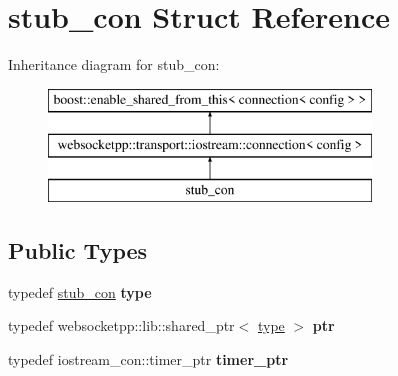 \hypertarget{structstub__con}{}\section{stub\+\_\+con Struct Reference}
\label{structstub__con}
Inheritance diagram for stub\+\_\+con\+:\begin{figure}[H]
\begin{center}
\leavevmode
\includegraphics[height=3.000000cm]{structstub__con}
\end{center}
\end{figure}
\subsection*{Public Types}
\begin{DoxyCompactItemize}
\item 
typedef \hyperlink{structstub__con}{stub\+\_\+con} {\bfseries type}\hypertarget{structstub__con_a5ca630044e6795a895c38ea34a757c22}{}\label{structstub__con_a5ca630044e6795a895c38ea34a757c22}

\item 
typedef websocketpp\+::lib\+::shared\+\_\+ptr$<$ \hyperlink{structstub__con}{type} $>$ {\bfseries ptr}\hypertarget{structstub__con_a98ad8f9925a9530ac1a8e4406e4a2287}{}\label{structstub__con_a98ad8f9925a9530ac1a8e4406e4a2287}

\item 
typedef iostream\+\_\+con\+::timer\+\_\+ptr {\bfseries timer\+\_\+ptr}\hypertarget{structstub__con_abb094936e96fb9d205f435a36bb3c19a}{}\label{structstub__con_abb094936e96fb9d205f435a36bb3c19a}

\end{DoxyCompactItemize}
